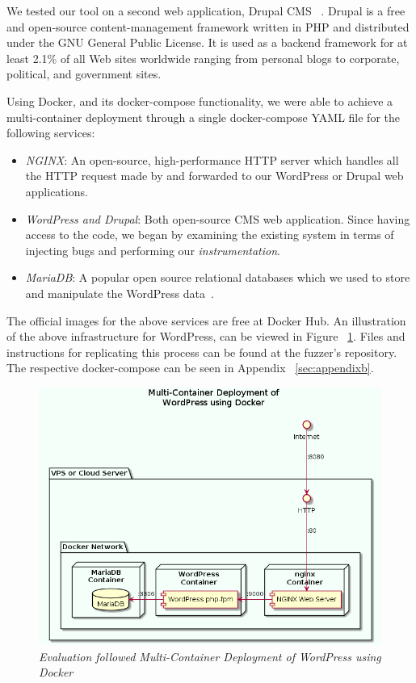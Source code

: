We tested our tool on a second web application, Drupal CMS ~\cite{drupal}. Drupal is a free and open-source content-management framework written in PHP and distributed under the GNU General Public License. It is used as a backend framework for at least 2.1\% of all Web sites worldwide ranging from personal blogs to corporate, political, and government sites.

Using Docker, and its docker-compose functionality, we were able to achieve a multi-container deployment through a single docker-compose YAML file for the following services:

\begin{itemize}
	\item \emph{NGINX}: An open-source, high-performance HTTP server which handles all the HTTP request made by \pname{} and forwarded to our WordPress or Drupal web applications.{~\cite{nginx}}
	\item \emph{WordPress and Drupal}: Both open-source CMS web application. Since having access to the code, we began by examining the existing system in terms of injecting bugs and performing our \emph{instrumentation}.
	\item \emph{MariaDB}: A popular open source relational databases which we used to store and manipulate the WordPress data~\cite{mariadb}.
\end{itemize}

The official images for the above services are free at Docker Hub. An illustration of the above infrastructure for WordPress, can be viewed in Figure ~\ref{fig:multi-container}. Files and instructions for replicating this process can be found at the fuzzer's repository. The respective docker-compose can be seen in Appendix ~\ref{sec:appendixb}.

\begin{figure}[ht]
 \centering
 \captionsetup{justification=centering}
 \includegraphics[width=\linewidth]{figures/multi-container.png}
 \caption[Multi-Container Deployment of WordPress using Docker]{\textit{Evaluation followed Multi-Container Deployment of WordPress using Docker}}
 \label{fig:multi-container}
\end{figure}


